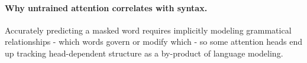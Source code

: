 \documentclass[11pt]{article}
\begin{document}
\paragraph{Why untrained attention correlates with syntax.}
Accurately predicting a masked word requires implicitly modeling grammatical
relationships - which words govern or modify which - so some attention heads
end up tracking head-dependent structure as a by-product of language
modeling.
\end{document}
